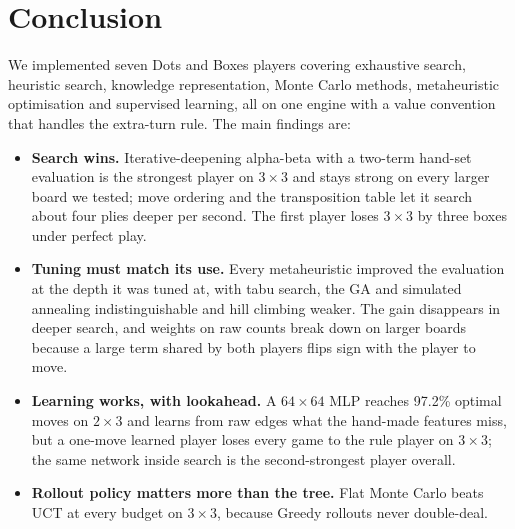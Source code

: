 \documentclass[11pt,a4paper]{article}
\newcommand{\bd}[2]{$#1{\times}#2$}            %
\begin{document}
\section{Conclusion}

We implemented seven Dots and Boxes players covering exhaustive search, heuristic search,
knowledge representation, Monte Carlo methods, metaheuristic optimisation and supervised
learning, all on one engine with a value convention that handles the extra-turn rule.
The main findings are:
\begin{itemize}
\item \textbf{Search wins.} Iterative-deepening alpha-beta with a two-term hand-set
  evaluation is the strongest player on \bd{3}{3} and stays strong on every larger board
  we tested; move ordering and the
  transposition table let it search about four plies deeper per second. The first player
  loses \bd{3}{3} by three boxes under perfect play.
\item \textbf{Tuning must match its use.} Every metaheuristic improved the evaluation at
  the depth it was tuned at, with tabu search, the GA and simulated annealing
  indistinguishable and hill climbing weaker. The gain disappears in deeper search, and
  weights on raw counts break down on larger boards because a large term shared by both
  players flips sign with the player to move.
\item \textbf{Learning works, with lookahead.} A $64{\times}64$ MLP reaches 97.2\% optimal
  moves on \bd{2}{3} and learns from raw edges what the hand-made features miss, but a
  one-move learned player loses every game to the rule player on \bd{3}{3}; the same
  network inside search is the second-strongest player overall.
\item \textbf{Rollout policy matters more than the tree.} Flat Monte Carlo beats UCT at
  every budget on \bd{3}{3}, because Greedy rollouts never double-deal.
\end{itemize}
\end{document}
